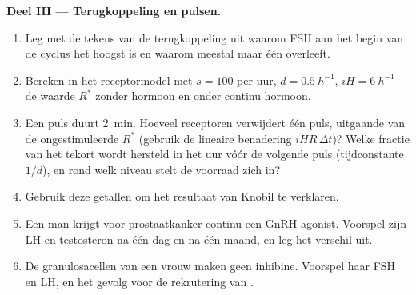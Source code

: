 \begin{problem}
\medskip
\noindent\textbf{Deel III --- Terugkoppeling en pulsen.}
\begin{enumerate}[resume]
  \item Leg met de tekens van de terugkoppeling uit waarom FSH aan het begin
        van de cyclus het hoogst is en waarom meestal maar één 
        overleeft.
  \item Bereken in het receptormodel met $s = 100$ per uur, $d =
        \qty{0.5}{h^{-1}}$, $iH = \qty{6}{h^{-1}}$ de waarde $R^*$
        zonder hormoon en onder continu hormoon.
  \item Een puls duurt \qty{2}{min}. Hoeveel receptoren verwijdert één puls,
        uitgaande van de ongestimuleerde
        $R^*$ (gebruik de lineaire benadering $iHR\,\Delta t$)? Welke fractie
        van het tekort wordt hersteld in het uur vóór de volgende puls
        (tijdconstante $1/d$), en rond welk niveau stelt de voorraad zich
        in?
  \item Gebruik deze getallen om het resultaat van Knobil te verklaren.
  \item Een man krijgt voor prostaatkanker continu een GnRH-agonist.
        Voorspel zijn LH en testosteron na één dag en na één maand, en leg
        het verschil uit.
  \item De granulosacellen van een vrouw maken geen inhibine. Voorspel haar
        FSH en LH, en het gevolg voor de rekrutering van .
\end{enumerate}


\end{problem}
